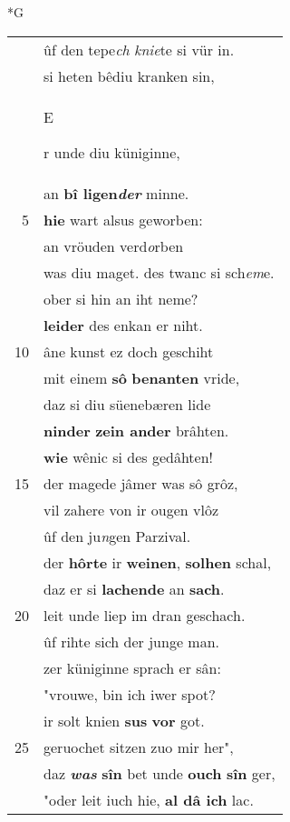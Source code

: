 \documentclass[8pt,a4paper,notitlepage]{article}
\begin{document}
\newpage
\begin{table}[ht]
\begin{minipage}[t]{0.5\linewidth}
\small
\begin{center}*G
\end{center}
\begin{tabular}{rl}
 & ûf den tepe\textit{ch} \textit{knie}te si vür in.\\ 
 & si heten bêdiu kranken sin,\\ 
 & \begin{large}E\end{large}r unde diu küniginne,\\ 
 & an \textbf{bî ligen\textit{der}} minne.\\ 
5 & \textbf{hie} wart alsus geworben:\\ 
 & an vröuden verd\textit{o}rben\\ 
 & was diu maget. des twanc si sch\textit{em}e.\\ 
 & ober si hin an iht neme?\\ 
 & \textbf{leider} des enkan er niht.\\ 
10 & âne kunst ez doch geschiht\\ 
 & mit einem \textbf{sô} \textbf{benanten} vride,\\ 
 & daz si diu süenebæren lide\\ 
 & \textbf{ninder} \textbf{zein ander} brâhten.\\ 
 & \textbf{wie} wênic si des gedâhten!\\ 
15 & der magede jâmer was sô grôz,\\ 
 & vil zahere von ir ougen vlôz\\ 
 & ûf den ju\textit{n}gen Parzival.\\ 
 & der \textbf{hôrte} ir \textbf{weinen}, \textbf{solhen} schal,\\ 
 & daz er si \textbf{lachende} an \textbf{sach}.\\ 
20 & leit unde liep im dran geschach.\\ 
 & ûf rihte sich der junge man.\\ 
 & zer küniginne sprach er sân:\\ 
 & "vrouwe, bin ich iwer spot?\\ 
 & ir solt knien \textbf{sus} \textbf{vor} got.\\ 
25 & geruochet sitzen zuo mir her",\\ 
 & daz \textit{\textbf{was}} \textbf{sîn} bet unde \textbf{ouch} \textbf{sîn} ger,\\ 
 & "oder leit iuch hie, \textbf{al dâ ich} lac.\\ 

\end{tabular}
\end{minipage}
\end{table}
\end{document}
